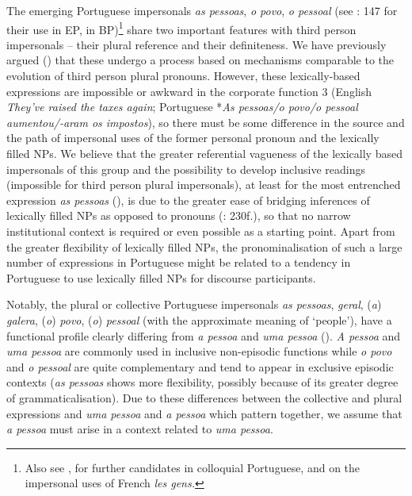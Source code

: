 \documentclass[output=paper]{langscibook}
\begin{document}
{The emerging Portuguese impersonals} {\textit{as pessoas}},{ \textit{o povo}},{ \textit{o pessoal}} {(see \citealt{Afonso2008}: 147 for their use in EP, \citealt{AmaralMihatsch2019} in BP)}\footnote{Also see , \citet{SilvaCoelho2020} for further candidates in colloquial Portuguese, and \citet{CappeauSchnedecker2015} on the impersonal uses of French \textit{les gens.}} share two important features with third person impersonals – their plural reference and their definiteness. We have previously argued (\citealt{AmaralMihatsch2019}) that these undergo a process based on mechanisms comparable to the evolution of third person plural pronouns. However, these lexically{}-based expressions are impossible or awkward in the corporate function 3 (English {\textit{They’ve raised the taxes again}}{; Portuguese *}{\textit{As pessoas\slash o povo\slash o pessoal aumentou/-aram os impostos}}{), so there must be some difference in the source and the path of impersonal uses of the former personal pronoun and the lexically filled NPs. We believe that the greater referential vagueness of the lexically based impersonals of this group and the possibility to develop inclusive readings (impossible for third person plural impersonals), at least for the most entrenched expression }{\textit{as pessoas} }{(\citealt{AmaralMihatsch2019}), is due to the greater ease of bridging inferences of lexically filled NPs as opposed to pronouns (\citealt{KoenigMauner1999}: 230f.), so that no narrow institutional context is required or even possible as a starting point. Apart from the greater flexibility of lexically filled NPs, the pronominalisation of such a large number of expressions in Portuguese might be related to a tendency in Portuguese to use lexically filled NPs for discourse participants.}



{Notably, the plural or collective Portuguese impersonals} {\textit{as pessoas}}, \textit{geral}, ({\textit{a}}){ \textit{galera}},{ }({\textit{o}}){ \textit{povo}},{ }({\textit{o}}){ \textit{pessoal} }{(with the approximate meaning of ‘people’),}{ }{have a functional profile clearly differing from} {\textit{a pessoa}} {and} {\textit{uma pessoa}} {(\citealt{AmaralMihatsch2019}).} {\textit{A pessoa}} {and} {\textit{uma pessoa}} {are commonly used in inclusive non-episodic functions while} {\textit{o povo} }{and}{ \textit{o pessoal}} {are quite complementary and tend to appear in exclusive episodic contexts (}{\textit{as pessoas} }{shows more flexibility, possibly because of its greater degree of grammaticalisation). Due to these differences between the collective and plural expressions and} {\textit{uma pessoa}} {and} {\textit{a pessoa}} {which pattern together, we assume that} {\textit{a pessoa}} {must arise in a context related to} {\textit{uma pessoa}}. 
\end{document}
